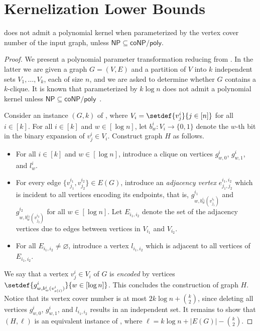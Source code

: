 \section{Kernelization Lower Bounds}

\begin{theorem}\label{thm:induced_no_kernel}
    {\InducedM} does not admit a polynomial kernel when parameterized by the vertex cover number
    of the input graph, unless $\mathsf{NP} \subseteq \mathsf{coNP} \slash \mathsf{poly}$.
\end{theorem}

\begin{proof}
    We present a polynomial parameter transformation reducing from \kMC.
    In the latter we are given a graph $G = (V, E)$ and a partition of $V$ into $k$ independent sets $V_1, \ldots, V_k$, each of size $n$,
    and we are asked to determine whether $G$ contains a $k$-clique.
    It is known that {\kMC} parameterized by $k \log n$ does not admit a polynomial kernel
    unless $\mathsf{NP} \subseteq \mathsf{coNP} \slash \mathsf{poly}$~\cite{algorithmica/HermelinKSWW15}.

    Consider an instance $(G,k)$ of \kMC, where $V_i = \setdef{v^i_j}{j \in [n]}$ for all $i \in [k]$.
    For all $i \in [k]$ and $w \in [\log n]$,
    let $b^i_w \colon V_i \to \{ 0,1 \}$ denote the $w$-th bit in the binary expansion of $v^i_j \in V_i$.
    Construct graph $H$ as follows.
    \begin{itemize}
        \item For all $i \in [k]$ and $w \in [\log n]$, introduce a clique on vertices $g^i_{w,0}$, $g^i_{w,1}$, and $l^i_w$.
        \item For every edge $\{ v^{i_1}_{j_1}, v^{i_2}_{j_2} \} \in E(G)$,
        introduce an \emph{adjacency vertex} $e^{i_1,i_2}_{j_1,j_2}$ which is incident to all vertices
        encoding its endpoints, that is, $g^{i_1}_{w,b^{i_1}_w(v^{i_1}_{j_1})}$ and $g^{i_2}_{w,b^{i_2}_w(v^{i_2}_{j_2})}$ for all $w \in [\log n]$.
        Let $E_{i_1,i_2}$ denote the set of the adjacency vertices due to edges between vertices in
        $V_{i_1}$ and $V_{i_2}$.
        \item For all $E_{i_1,i_2} \neq \varnothing$, introduce a vertex $l_{i_1,i_2}$ which is adjacent to all vertices of $E_{i_1,i_2}$.
    \end{itemize}
    We say that a vertex $v^i_j \in V_i$ of $G$ is \emph{encoded} by vertices $\setdef{g^i_{w,b^i_w(v^i_{s(i)})}}{w \in [\log n]}$.
    This concludes the construction of graph $H$.
    Notice that its vertex cover number is at most $2k \log n + \binom{k}{2}$,
    since deleting all vertices $g^i_{w,0}$, $g^i_{w,1}$, and $l_{i_1,i_2}$ results in an independent set.
    It remains to show that $(H, \ell)$ is an equivalent instance of \InducedM, where $\ell = k \log n + |E(G)| - \binom{k}{2}$.


\end{proof}

